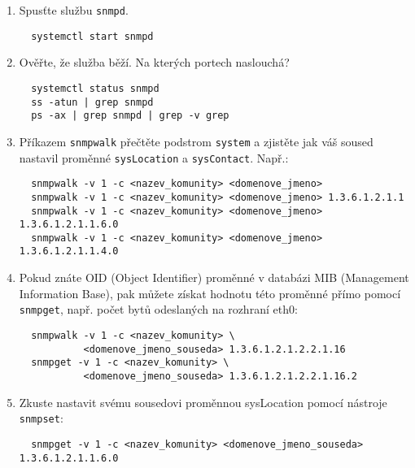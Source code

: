 \begin{itemize}
\begin{enumerate}
\begin{enumerate}
{           <COMMUNITY> 10.10.10.0/24} a lokálnímu počítači i zápis {\tt rwcommunity <COMMUNITY>
           localhost}
           \item V konfiguračním souboru ještě nastavte SNMP proměnnou {\tt sysContact}
           na Vámi vymyšlenou hodnotu. Takto nastavená proměnná bude vždy pouze pro čtení bez ohledu
           na nastavení přístupových pravidel.
           \item Nastavte proměnnou sysLocation pomocí příkazu {\tt snmpset}
\begin{verbatim}
  snmpset -v1 -c <nazev_komunity> localhost 1.3.6.1.2.1.1.6.0 s <retezec>
\end{verbatim}
           \end{enumerate}
            \item Spusťte službu {\tt snmpd}.
\begin{verbatim}
  systemctl start snmpd
\end{verbatim} 
            \item Ověřte, že služba běží. Na kterých portech naslouchá?
\begin{verbatim}
  systemctl status snmpd
  ss -atun | grep snmpd
  ps -ax | grep snmpd | grep -v grep
\end{verbatim} 
          \item Příkazem {\tt snmpwalk} přečtěte podstrom {\tt system} a zjistěte jak váš
          soused nastavil proměnné {\tt sysLocation} a {\tt sysContact}. Např.:
\begin{verbatim}
  snmpwalk -v 1 -c <nazev_komunity> <domenove_jmeno>
  snmpwalk -v 1 -c <nazev_komunity> <domenove_jmeno> 1.3.6.1.2.1.1
  snmpwalk -v 1 -c <nazev_komunity> <domenove_jmeno> 1.3.6.1.2.1.1.6.0
  snmpwalk -v 1 -c <nazev_komunity> <domenove_jmeno> 1.3.6.1.2.1.1.4.0
\end{verbatim}

          \item Pokud znáte OID (Object Identifier) proměnné v databázi MIB (Management Information Base), pak
          můžete získat hodnotu této proměnné
          přímo pomocí {\tt snmpget}, např. počet bytů odeslaných na rozhraní eth0:
\begin{verbatim}
  snmpwalk -v 1 -c <nazev_komunity> \
           <domenove_jmeno_souseda> 1.3.6.1.2.1.2.2.1.16
  snmpget -v 1 -c <nazev_komunity> \
           <domenove_jmeno_souseda> 1.3.6.1.2.1.2.2.1.16.2
\end{verbatim}
          \item Zkuste nastavit svému sousedovi proměnnou sysLocation
          pomocí nástroje {\tt snmpset}:
\begin{verbatim}
  snmpget -v 1 -c <nazev_komunity> <domenove_jmeno_souseda> 1.3.6.1.2.1.1.6.0


\end{verbatim}
\end{enumerate}
\end{itemize}
